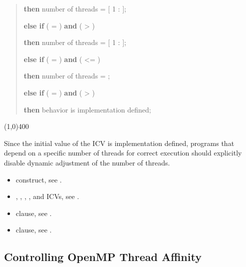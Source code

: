 \begin{samepage}
\begin{quote}
\textbf{then} number of threads = [ 1 :  ];

\textbf{else if} ( = ) \textbf{and} ( > )

\textbf{then} number of threads = [ 1 :  ];

\textbf{else if} ( = ) \textbf{and} ( <= )

\textbf{then} number of threads = ;

\textbf{else if} ( = ) \textbf{and} ( > )

\textbf{then} behavior is implementation defined;
\end{quote}

\nolinenumbers\line(1,0){400}\linenumbers
\end{samepage}
\bigskip

\begin{note}
Since the initial value of the  ICV is implementation defined, programs
that depend on a specific number of threads for correct execution should explicitly
disable dynamic adjustment of the number of threads.
\end{note}

\crossreferences
\begin{itemize}

\item {} construct, see .

\item {}, , ,
, and  ICVs, see
.

\item {} clause, see .

\item {} clause, see .
\end{itemize}










\subsection{Controlling OpenMP Thread Affinity}
\label{subsec:Controlling OpenMP Thread Affinity}

